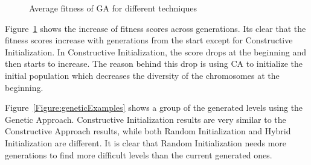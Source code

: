 \documentclass[letterpaper]{article}
\newcommand{\figref}[1]{Figure~\ref{Figure:#1}}
\begin{document}
\begin{figure}[ht]
  	\centering
    \caption{Average fitness of GA for different techniques}
    \label{Figure:geneticImprovement}
\end{figure}

\figref{geneticImprovement} shows the increase of fitness scores across generations. Its clear that the fitness scores increase with generations from the start except for Constructive Initialization. In Constructive Initialization, the score drops at the beginning and then starts to increase. The reason behind this drop is using CA to initialize the initial population which decreases the diversity of the chromosomes at the beginning.\\\par

\figref{geneticExamples} shows a group of the generated levels using the Genetic Approach. Constructive Initialization results are very similar to the Constructive Approach results, while both Random Initialization and Hybrid Initialization are different. It is clear that Random Initialization needs more generations to find more difficult levels than the current generated ones.
\end{document}
